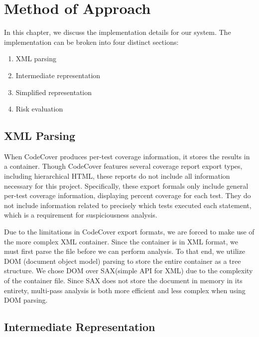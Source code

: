 %
%
%
\chapter{Method of Approach} \label{ch:method}
In this chapter, we discuss the implementation details for our system.  The
implementation can be broken into four distinct sections:

\begin{enumerate}
\item XML parsing
\item Intermediate representation
\item Simplified representation
\item Risk evaluation
\end{enumerate}

\section{XML Parsing} \label{sec:parse}

When CodeCover produces per-test coverage information, it stores the results in
a container.  Though CodeCover features several coverage report export types, 
including hierarchical HTML, these reports do not include all information
necessary for this project.  Specifically, these export formals only include
general per-test coverage information, displaying percent coverage for each test.
They do not include information related to precisely which tests executed each 
statement, which is a requirement for suspiciousness analysis.  

Due to the limitations in CodeCover export formats, we are forced to make use of
the more complex XML container.  Since the container is in XML format, we must
first parse the file before we can perform analysis.  To that end, we utilize
DOM (document object model) parsing to store the entire container as a tree structure.  
We chose DOM over SAX(simple API for XML) due to the complexity of the container file.
Since SAX does not store the document in memory in its entirety, multi-pass analysis
is both more efficient and less complex when using DOM parsing.

\section{Intermediate Representation} \label{sec:ir}

